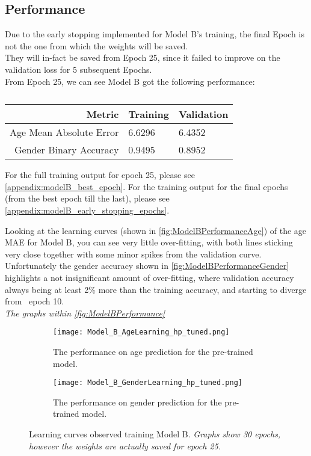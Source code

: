 \subsection{Performance}
Due to the early stopping implemented for Model B's training, the final Epoch is not the one from which the weights will be saved.\\
They will in-fact be saved from Epoch 25, since it failed to improve on the validation loss for 5 subsequent Epochs.\\
From Epoch 25, we can see Model B got the following performance:
\begin{table}[h!]
    \centering
    \begin{tabular}[h]{r|l|l}
        \hline
        Metric & Training & Validation \\
        \hline
        Age Mean Absolute Error & 6.6296 & 6.4352 \\
        \hline
        Gender Binary Accuracy & 0.9495 & 0.8952 \\
        \hline
    \end{tabular}
    \caption{\label{tab:ModelB_Performance}}
\end{table}
For the full training output for epoch 25, please see \autoref{appendix:modelB_best_epoch}.
For the training output for the final epochs (from the best epoch till the last), please see \autoref{appendix:modelB_early_stopping_epochs}.

Looking at the learning curves (shown in \autoref{fig:ModelBPerformanceAge}) of the age MAE for Model B, you can see very little over-fitting, with both lines sticking very close together with some minor spikes from the validation curve.\\
Unfortunately the gender accuracy shown in \autoref{fig:ModelBPerformanceGender} highlights a not insignificant amount of over-fitting, where validation accuracy always being at least 2\% more than the training accuracy, and starting to diverge from ~epoch 10.\\
\textit{The graphs within \autoref{fig:ModelBPerformance} }\\

\begin{figure}[h!]
    \begin{subfigure}{\textwidth}
        \centering
        \texttt{[image: Model\_B\_AgeLearning\_hp\_tuned.png]}
    \caption{\label{fig:ModelBPerformanceAge}The performance on age prediction for the pre-trained model.}
    \end{subfigure}
    \begin{subfigure}{\textwidth}
        \centering
        \texttt{[image: Model\_B\_GenderLearning\_hp\_tuned.png]}
        \caption{\label{fig:ModelBPerformanceGender}The performance on gender prediction for the pre-trained model.}    
    \end{subfigure}
    \centering
    \caption{
        \label{fig:ModelBPerformance}Learning curves observed training Model B. \textit{Graphs show 30 epochs, however the weights are actually saved for epoch 25.}
        }
\end{figure}
